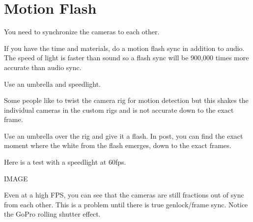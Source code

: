 \chapter{Motion Flash}
\pagecolor{white}
\label{chap:23}
\begin{fullwidth}


\problem

{\large You need to synchronize the cameras to each other. 

 \par}

If you have the time and materials, do a motion flash sync in addition to audio. The speed of light is faster than sound so a flash sync will be 900,000 times more accurate than audio sync. 
\solution

{\large Use an umbrella and speedlight.

 \par}

Some people like to twist the camera rig for motion detection but this shakes the individual cameras in the custom rigs and is not accurate down to the exact frame. 

Use an umbrella over the rig and give it a flash. In post, you can find the exact moment where the white from the flash emerges, down to the exact frames. 

Here is a test with a speedlight at 60fps. 

IMAGE

Even at a high FPS, you can see that the cameras are still fractions out of sync from each other. This is a problem until there is true genlock/frame sync. Notice the GoPro rolling shutter effect. 

\clearpage
\end{fullwidth}
